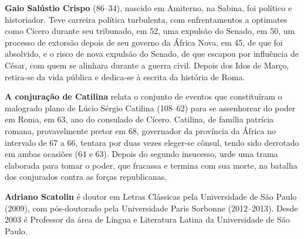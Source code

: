 \textbf{Gaio Salústio Crispo} (86--34), nascido em Amiterno, na Sabina, foi político e historiador. Teve carreira política turbulenta, com enfrentamentos a optimates como Cícero durante seu tribunado, em 52, uma expulsão do Senado, em 50, um processo de extorsão depois de seu governo da África Nova, em 45, de que foi absolvido, e o risco de nova expulsão do Senado, de que escapou por influência de César, com quem se alinhara durante a guerra civil. Depois dos Idos de Março, retira-se da vida pública e dedica-se à escrita da história de Roma.


\textbf{A conjuração de Catilina} relata o conjunto de eventos que constituíram o malogrado plano de Lúcio
Sérgio Catilina (108--62) para se assenhorear do poder em Roma, em 63,
ano do consulado de Cícero. Catilina, de família patrícia romana,
provavelmente pretor em 68, governador da província da África no intervalo
de 67 a 66, tentara por duas vezes eleger-se cônsul, tendo sido derrotado
em ambas ocasiões (64 e 63). Depois do segundo insucesso, urde uma trama elaborada
para tomar o poder, que fracassa e termina com sua morte, na batalha dos conjurados contra as forças republicanas.


\textbf{Adriano Scatolin} é doutor em Letras Clássicas pela
Universidade de São Paulo (2009), com pós-doutorado pela Universidade Paris
 Sorbonne (2012--2013). Desde 2003 é Professor da área de Língua e Literatura Latina da Universidade de
São Paulo.


